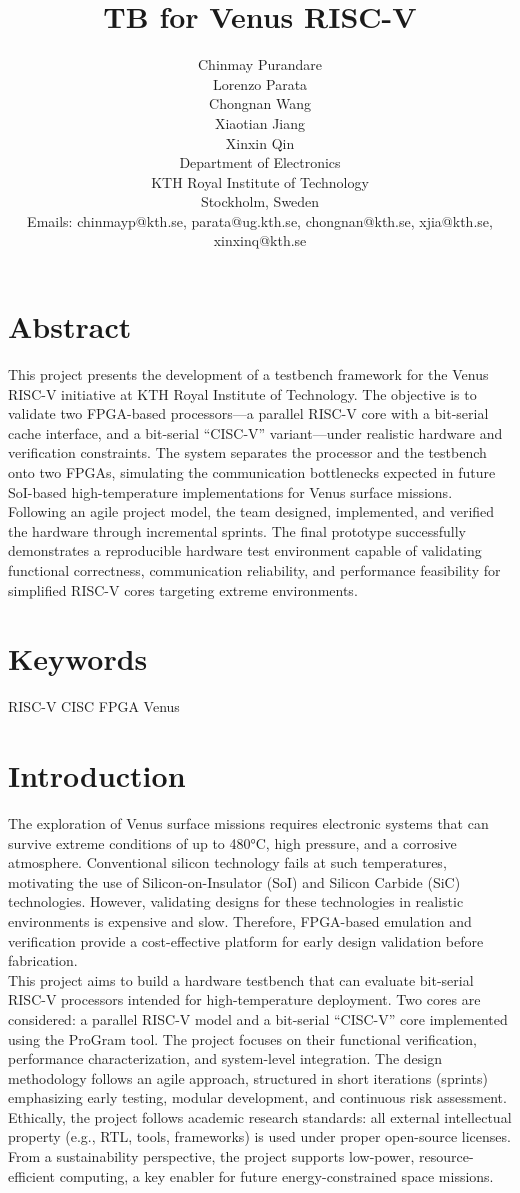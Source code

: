 \documentclass[10pt,twocolumn]{article}
\title{\textbf{TB for Venus RISC-V}\\[0.5em]}
\author{Chinmay Purandare\\
Lorenzo Parata\\
Chongnan Wang\\
Xiaotian Jiang \\
Xinxin Qin \\
Department of Electronics\\
KTH Royal Institute of Technology\\
Stockholm, Sweden\\
Emails: chinmayp@kth.se, parata@ug.kth.se, chongnan@kth.se, xjia@kth.se, xinxinq@kth.se}
\date{}
\begin{document}
\maketitle

\section*{Abstract}
This project presents the development of a testbench framework for the Venus RISC-V initiative at KTH Royal Institute of Technology. The objective is to validate two FPGA-based processors—a parallel RISC-V core with a bit-serial cache interface, and a bit-serial “CISC-V” variant—under realistic hardware and verification constraints. The system separates the processor and the testbench onto two FPGAs, simulating the communication bottlenecks expected in future SoI-based high-temperature implementations for Venus surface missions. Following an agile project model, the team designed, implemented, and verified the hardware through incremental sprints. The final prototype successfully demonstrates a reproducible hardware test environment capable of validating functional correctness, communication reliability, and performance feasibility for simplified RISC-V cores targeting extreme environments.

\section*{Keywords}
RISC-V CISC FPGA Venus

\section{Introduction}
The exploration of Venus surface missions requires electronic systems that can survive extreme conditions of up to 480°C, high pressure, and a corrosive atmosphere. Conventional silicon technology fails at such temperatures, motivating the use of Silicon-on-Insulator (SoI) and Silicon Carbide (SiC) technologies. However, validating designs for these technologies in realistic environments is expensive and slow. Therefore, FPGA-based emulation and verification provide a cost-effective platform for early design validation before fabrication.\\
This project aims to build a hardware testbench that can evaluate bit-serial RISC-V processors intended for high-temperature deployment. Two cores are considered: a parallel RISC-V model and a bit-serial “CISC-V” core implemented using the ProGram tool. The project focuses on their functional verification, performance characterization, and system-level integration. The design methodology follows an agile approach, structured in short iterations (sprints) emphasizing early testing, modular development, and continuous risk assessment.\\
Ethically, the project follows academic research standards: all external intellectual property (e.g., RTL, tools, frameworks) is used under proper open-source licenses. From a sustainability perspective, the project supports low-power, resource-efficient computing, a key enabler for future energy-constrained space missions.
\end{document}

